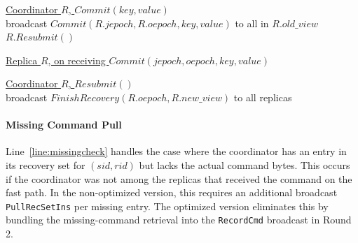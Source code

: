 \documentclass[twocolumn]{article}
\begin{document}
\begin{algorithm}
\caption{$Commit(key, value)$ and $Resubmit()$}
\label{alg:jetpack_commit_resubmit}
\setcounter{AlgoLine}{90}

\underline{Coordinator $R$, $Commit(key, value)$}\\
broadcast $Commit(R.jepoch, R.oepoch, key, value)$ to all in $R.old\_view$\\
$R.Resubmit()$\\

\vskip 6pt

\underline{Replica $R$, on receiving $Commit(jepoch, oepoch, key, value)$}\\

\vskip 6pt

\underline{Coordinator $R$, $Resubmit()$}\\
broadcast $FinishRecovery(R.oepoch, R.new\_view)$ to all replicas\label{line:finishrecovery}\\
\end{algorithm}

\paragraph{Missing Command Pull}
Line~\ref{line:missingcheck} handles the case where the coordinator has an entry in its recovery set for $(sid, rid)$ but lacks the actual command bytes. This occurs if the coordinator was not among the replicas that received the command on the fast path. In the non-optimized version, this requires an additional broadcast \texttt{PullRecSetIns} per missing entry. The optimized version eliminates this by bundling the missing-command retrieval into the \texttt{RecordCmd} broadcast in Round 2.
\end{document}
